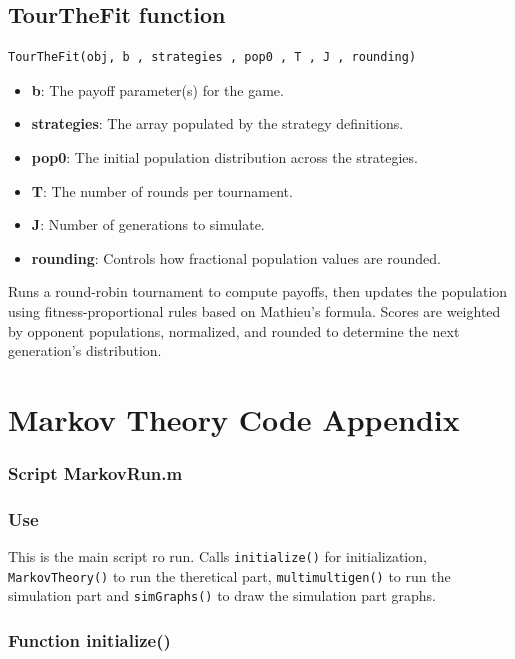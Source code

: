 \documentclass[12pt]{report}
\begin{document}
\subsection{TourTheFit function}

\begin{verbatim}
TourTheFit(obj, b , strategies , pop0 , T , J , rounding)
\end{verbatim}

\begin{itemize}
  \item \textbf{b}: The payoff parameter(s) for the game.
  \item \textbf{strategies}: The array populated by the strategy definitions.
  \item \textbf{pop0}: The initial population distribution across the strategies.
  \item \textbf{T}: The number of rounds per tournament.
  \item \textbf{J}: Number of generations to simulate.
  \item \textbf{rounding}: Controls how fractional population values are rounded.
\end{itemize}

Runs a round-robin tournament to compute payoffs, then updates the population using fitness-proportional rules based on Mathieu's formula. Scores are weighted by opponent populations, normalized, and rounded to determine the next generation's distribution.

\section{Markov Theory Code Appendix}


\subsubsection*{Script MarkovRun.m}
\subsubsection*{Use}
This is the main script ro run. Calls \texttt{initialize()} for initialization, \texttt{MarkovTheory()} to run the theretical part, \texttt{multimultigen()} to run the simulation part and \texttt{simGraphs()} to draw the simulation part graphs.


\subsubsection*{Function initialize()}
\end{document}
